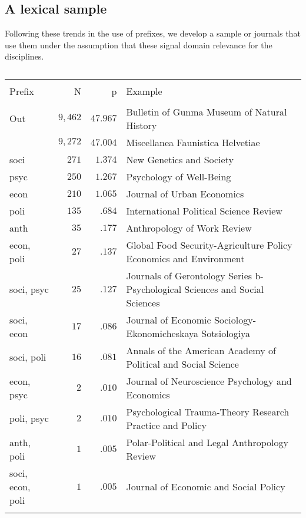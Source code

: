 \documentclass[]{article}
\begin{document}
\subsection{A lexical sample}\label{a-lexical-sample}

Following these trends in the use of prefixes, we develop a sample or
journals that use them under the assumption that these signal domain
relevance for the disciplines.

\begin{table}[!htbp] \centering 
  \caption{} 
  \label{Journals in the Web of Knowledge Master List} 
\begin{tabular}{@{\extracolsep{5pt}} lrrl} 
\\[-1.8ex]\hline 
\hline \\[-1.8ex] 
Prefix & N & p & Example \\ 
\hline \\[-1.8ex] 
Out & $9,462$ & $47.967$ & Bulletin of Gunma Museum of Natural History \\ 
 & $9,272$ & $47.004$ & Miscellanea Faunistica Helvetiae \\ 
soci & $271$ & $1.374$ & New Genetics and Society \\ 
psyc & $250$ & $1.267$ & Psychology of Well-Being \\ 
econ & $210$ & $1.065$ & Journal of Urban Economics \\ 
poli & $135$ & $.684$ & International Political Science Review \\ 
anth & $35$ & $.177$ & Anthropology of Work Review \\ 
econ, poli & $27$ & $.137$ & Global Food Security-Agriculture Policy Economics and Environment \\ 
soci, psyc & $25$ & $.127$ & Journals of Gerontology Series b-Psychological Sciences and Social Sciences \\ 
soci, econ & $17$ & $.086$ & Journal of Economic Sociology-Ekonomicheskaya Sotsiologiya \\ 
soci, poli & $16$ & $.081$ & Annals of the American Academy of Political and Social Science \\ 
econ, psyc & $2$ & $.010$ & Journal of Neuroscience Psychology and Economics \\ 
poli, psyc & $2$ & $.010$ & Psychological Trauma-Theory Research Practice and Policy \\ 
anth, poli & $1$ & $.005$ & Polar-Political and Legal Anthropology Review \\ 
soci, econ, poli & $1$ & $.005$ & Journal of Economic and Social Policy \\ 
\hline \\[-1.8ex] 
\end{tabular} 
\end{table}
\end{document}
